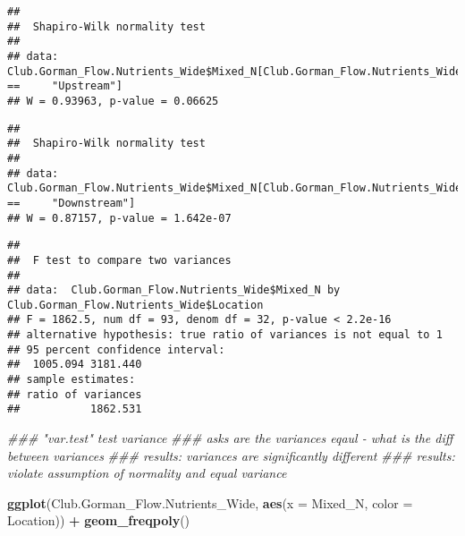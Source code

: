 \documentclass[]{article}
\newenvironment{Shaded}{\begin{snugshade}}{\end{snugshade}}
\newcommand{\CommentTok}[1]{\textcolor[rgb]{0.56,0.35,0.01}{\textit{#1}}}
\newcommand{\DataTypeTok}[1]{\textcolor[rgb]{0.13,0.29,0.53}{#1}}
\newcommand{\KeywordTok}[1]{\textcolor[rgb]{0.13,0.29,0.53}{\textbf{#1}}}
\newcommand{\NormalTok}[1]{#1}
\newcommand{\OperatorTok}[1]{\textcolor[rgb]{0.81,0.36,0.00}{\textbf{#1}}}
\newcommand{\StringTok}[1]{\textcolor[rgb]{0.31,0.60,0.02}{#1}}
\begin{document}
\begin{verbatim}
## 
##  Shapiro-Wilk normality test
## 
## data:  Club.Gorman_Flow.Nutrients_Wide$Mixed_N[Club.Gorman_Flow.Nutrients_Wide$Location ==     "Upstream"]
## W = 0.93963, p-value = 0.06625
\end{verbatim}

\begin{Shaded}
\end{Shaded}

\begin{verbatim}
## 
##  Shapiro-Wilk normality test
## 
## data:  Club.Gorman_Flow.Nutrients_Wide$Mixed_N[Club.Gorman_Flow.Nutrients_Wide$Location ==     "Downstream"]
## W = 0.87157, p-value = 1.642e-07
\end{verbatim}

\begin{Shaded}
\end{Shaded}

\begin{verbatim}
## 
##  F test to compare two variances
## 
## data:  Club.Gorman_Flow.Nutrients_Wide$Mixed_N by Club.Gorman_Flow.Nutrients_Wide$Location
## F = 1862.5, num df = 93, denom df = 32, p-value < 2.2e-16
## alternative hypothesis: true ratio of variances is not equal to 1
## 95 percent confidence interval:
##  1005.094 3181.440
## sample estimates:
## ratio of variances 
##           1862.531
\end{verbatim}

\begin{Shaded}
\begin{Highlighting}[]
\CommentTok{### "var.test" test variance }
\CommentTok{### asks are the variances eqaul - what is the diff between variances }
\CommentTok{### results: variances are significantly different }
\CommentTok{### results: violate assumption of normality and equal variance}

\KeywordTok{ggplot}\NormalTok{(Club.Gorman_Flow.Nutrients_Wide, }\KeywordTok{aes}\NormalTok{(}\DataTypeTok{x =}\NormalTok{ Mixed_N, }\DataTypeTok{color =}\NormalTok{ Location)) }\OperatorTok{+}
\StringTok{  }\KeywordTok{geom_freqpoly}\NormalTok{()}
\end{Highlighting}
\end{Shaded}
\end{document}
